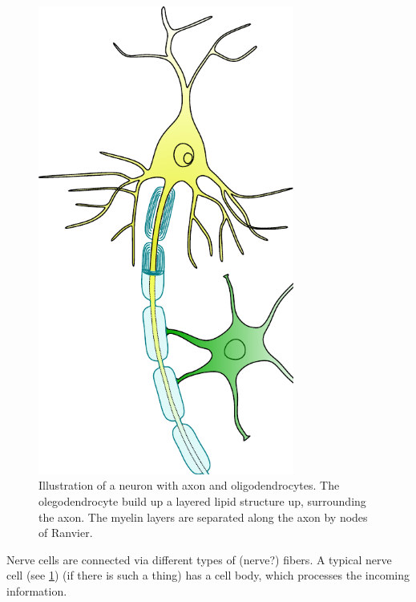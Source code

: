 \begin{figure}[!t]
\centering
\includegraphics[angle=90,width=0.75\textwidth,]{gfx/neuroanatomy/neuron-axon_.pdf}
\caption{%
Illustration of a neuron with axon and oligodendrocytes. The olegodendrocyte build up a layered lipid structure up, surrounding the axon. The myelin layers are separated along the axon by nodes of Ranvier. }
\label{fig:human-brain}
\end{figure}
% 
Nerve cells are connected via different types of (nerve?) fibers.
A typical nerve cell (see \cref{fig:human-brain}) (if there is such a thing) has a cell body, which processes the incoming information.
